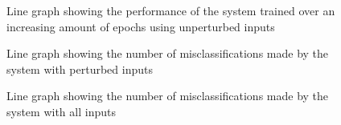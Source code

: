 \begin{table}[h]
	\centering
	\caption{Table showing the best results of the \ac{AV} prediction \ac{SNN} using perturbed images, trained for 700 epochs}
	\label{tbl:sign-respertbest}
\end{table}

\begin{figure}[t]
	\centering
	\scalebox{1}{}
	\caption{Line graph showing the performance of the system trained over an increasing amount of epochs using unperturbed inputs \label{fig:sign-graph}}
\end{figure}

\begin{figure}[t]
	\centering
	\scalebox{1}{}
	\caption{Line graph showing the number of misclassifications made by the system with perturbed inputs \label{fig:sign-graphpert}}
\end{figure}

\begin{figure}[t]
	\centering
	\scalebox{1}{}
	\caption{Line graph showing the number of misclassifications made by the system with all inputs \label{fig:sign-graphboth}}
\end{figure}


